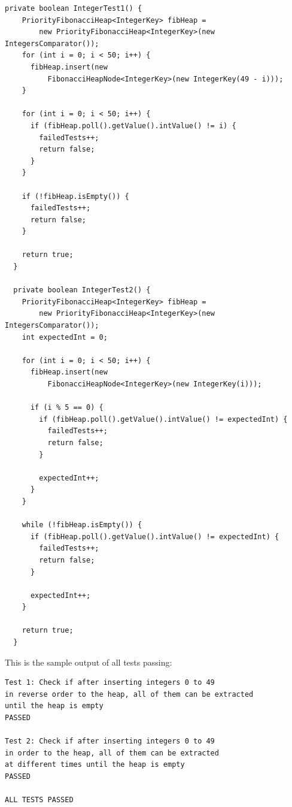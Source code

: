 \documentclass{article}
\begin{document}
\begin{lstlisting}
private boolean IntegerTest1() {  
    PriorityFibonacciHeap<IntegerKey> fibHeap = 
        new PriorityFibonacciHeap<IntegerKey>(new IntegersComparator());
    for (int i = 0; i < 50; i++) {
      fibHeap.insert(new 
          FibonacciHeapNode<IntegerKey>(new IntegerKey(49 - i)));
    }
    
    for (int i = 0; i < 50; i++) {
      if (fibHeap.poll().getValue().intValue() != i) {
        failedTests++;
        return false; 
      }
    }
    
    if (!fibHeap.isEmpty()) { 
      failedTests++;
      return false; 
    }
    
    return true;
  }
  
  private boolean IntegerTest2() {
    PriorityFibonacciHeap<IntegerKey> fibHeap = 
        new PriorityFibonacciHeap<IntegerKey>(new IntegersComparator());
    int expectedInt = 0;
    
    for (int i = 0; i < 50; i++) {
      fibHeap.insert(new 
          FibonacciHeapNode<IntegerKey>(new IntegerKey(i)));
      
      if (i % 5 == 0) {
        if (fibHeap.poll().getValue().intValue() != expectedInt) {
          failedTests++; 
          return false; 
        }
        
        expectedInt++;
      }
    }
    
    while (!fibHeap.isEmpty()) { 
      if (fibHeap.poll().getValue().intValue() != expectedInt) {
        failedTests++; 
        return false; 
      }
      
      expectedInt++;
    }
    
    return true;
  }
\end{lstlisting}

This is the sample output of all tests passing:

\begin{lstlisting}
Test 1: Check if after inserting integers 0 to 49
in reverse order to the heap, all of them can be extracted
until the heap is empty
PASSED

Test 2: Check if after inserting integers 0 to 49
in order to the heap, all of them can be extracted
at different times until the heap is empty
PASSED

ALL TESTS PASSED
\end{lstlisting}
\end{document}
